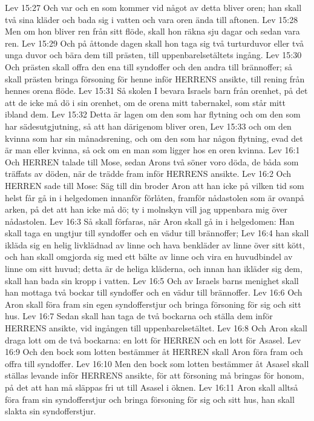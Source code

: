 Lev 15:27  Och var och en som kommer vid något av detta bliver oren; han skall två sina kläder och bada sig i vatten och vara oren ända till aftonen.
Lev 15:28  Men om hon bliver ren från sitt flöde, skall hon räkna sju dagar och sedan vara ren.
Lev 15:29  Och på åttonde dagen skall hon taga sig två turturduvor eller två unga duvor och bära dem till prästen, till uppenbarelsetältets ingång.
Lev 15:30  Och prästen skall offra den ena till syndoffer och den andra till brännoffer; så skall prästen bringa försoning för henne inför HERRENS ansikte, till rening från hennes orena flöde.
Lev 15:31  Så skolen I bevara Israels barn från orenhet, på det att de icke må dö i sin orenhet, om de orena mitt tabernakel, som står mitt ibland dem.
Lev 15:32  Detta är lagen om den som har flytning och om den som har sädesutgjutning, så att han därigenom bliver oren,
Lev 15:33  och om den kvinna som har sin månadsrening, och om den som har någon flytning, evad det är man eller kvinna, så ock om en man som ligger hos en oren kvinna.
Lev 16:1  Och HERREN talade till Mose, sedan Arons två söner voro döda, de båda som träffats av döden, när de trädde fram inför HERRENS ansikte.
Lev 16:2  Och HERREN sade till Mose: Säg till din broder Aron att han icke på vilken tid som helst får gå in i helgedomen innanför förlåten, framför nådastolen som är ovanpå arken, på det att han icke må dö; ty i molnskyn vill jag uppenbara mig över nådastolen.
Lev 16:3  Så skall förfaras, när Aron skall gå in i helgedomen: Han skall taga en ungtjur till syndoffer och en vädur till brännoffer;
Lev 16:4  han skall ikläda sig en helig livklädnad av linne och hava benkläder av linne över sitt kött, och han skall omgjorda sig med ett bälte av linne och vira en huvudbindel av linne om sitt huvud; detta är de heliga kläderna, och innan han ikläder sig dem, skall han bada sin kropp i vatten.
Lev 16:5  Och av Israels barns menighet skall han mottaga två bockar till syndoffer och en vädur till brännoffer.
Lev 16:6  Och Aron skall föra fram sin egen syndofferstjur och bringa försoning för sig och sitt hus.
Lev 16:7  Sedan skall han taga de två bockarna och ställa dem inför HERRENS ansikte, vid ingången till uppenbarelsetältet.
Lev 16:8  Och Aron skall draga lott om de två bockarna: en lott för HERREN och en lott för Asasel.
Lev 16:9  Och den bock som lotten bestämmer åt HERREN skall Aron föra fram och offra till syndoffer.
Lev 16:10  Men den bock som lotten bestämmer åt Asasel skall ställas levande inför HERRENS ansikte, för att försoning må bringas för honom, på det att han må släppas fri ut till Asasel i öknen.
Lev 16:11  Aron skall alltså föra fram sin syndofferstjur och bringa försoning för sig och sitt hus, han skall slakta sin syndofferstjur.
